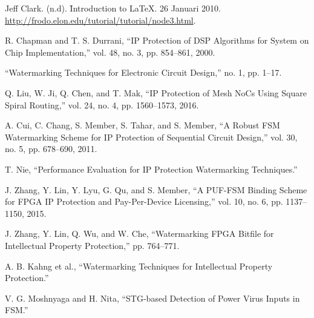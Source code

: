 %
% 

% 
% 
\begin{thebibliography}{4}

{Jeff Clark. (n.d). \f{Introduction to LaTeX}.
26 Januari 2010. \url{http://frodo.elon.edu/tutorial/tutorial/node3.html}.}

R. Chapman and T. S. Durrani, “IP Protection of DSP Algorithms for System on Chip Implementation,” vol. 48, no. 3, pp. 854–861, 2000.

“Watermarking Techniques for Electronic Circuit Design,” no. 1, pp. 1–17.

Q. Liu, W. Ji, Q. Chen, and T. Mak, “IP Protection of Mesh NoCs Using Square Spiral Routing,” vol. 24, no. 4, pp. 1560–1573, 2016.

A. Cui, C. Chang, S. Member, S. Tahar, and S. Member, “A Robust FSM Watermarking Scheme for IP Protection of Sequential Circuit Design,” vol. 30, no. 5, pp. 678–690, 2011.

T. Nie, “Performance Evaluation for IP Protection Watermarking Techniques.”

J. Zhang, Y. Lin, Y. Lyu, G. Qu, and S. Member, “A PUF-FSM Binding Scheme for FPGA IP Protection and Pay-Per-Device Licensing,” vol. 10, no. 6, pp. 1137–1150, 2015.

J. Zhang, Y. Lin, Q. Wu, and W. Che, “Watermarking FPGA Bitfile for Intellectual Property Protection,” pp. 764–771.

A. B. Kahng et al., “Watermarking Techniques for Intellectual Property Protection.”

V. G. Moshnyaga and H. Nita, “STG-based Detection of Power Virus Inputs in FSM.”

\end{thebibliography}

